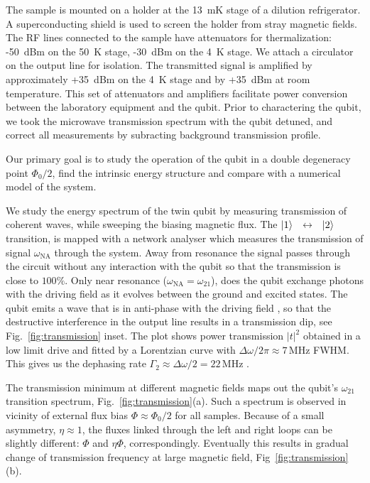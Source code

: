 \documentclass[%
reprint,
superscriptaddress,
bibnotes,
amsmath,
amssymb,
aps,
showkeys,
prb,
]{revtex4-1}
\newcommand{\iket}[1]{\ensuremath{\Ket{#1}}}
\newcommand{\ilra}{\ensuremath{\,\leftrightarrow\,}}
\begin{document}
The sample is mounted on a holder at the 13~mK
stage of  a dilution refrigerator.  A  superconducting shield is used  to screen
the holder  from stray magnetic  fields.  The RF  lines connected to  the sample
have attenuators for thermalization: -50~dBm on  the 50~K stage, -30~dBm on the
4~K  stage.  We  attach a  circulator on  the output  line for  isolation.  The
transmitted signal is amplified  by approximately +35~dBm on the 4~K stage  and by +35~dBm at
room  temperature.  This  set  of attenuators  and  amplifiers facilitate  power
conversion  between the  laboratory equipment  and the qubit.  Prior  to
charactering the qubit,  we  took  the microwave  transmission
spectrum with the qubit detuned, and  correct all measurements by subracting background
transmission profile.

Our primary goal  is to study the operation of the qubit in a double degeneracy point $\Phi_0/2$, find the intrinsic energy structure and  compare with a numerical model of the system.

We study the energy  spectrum  of the  twin qubit  by measuring transmission of coherent waves,  while  sweeping  the  biasing  magnetic flux.   
The  \iket{1}~\ilra~\iket{2}  transition, is  mapped  with a  network
analyser which measures  the transmission of signal  $\omega_{\text{NA}}$ through the
system.
Away from  resonance the signal passes through the  circuit without any
interaction with the qubit so that the transmission
is close to  $ 100\% $.  Only near resonance  ($\omega_{\text{NA}}=\omega_{21}$), does the
qubit exchange photons  with the driving field as it  evolves between the ground
and excited states.  The  qubit emits a wave that is in anti-phase with
the driving  field \cite{Abdumalikov_2010}, so that the  destructive interference in
the output line results in  a transmission dip, see Fig.~\ref{fig:transmission} inset. The plot shows power transmission $|t|^2$ obtained in a low limit drive and fitted by a Lorentzian curve with 
$\Delta\omega/2\pi\approx7\,\text{MHz}$ FWHM. This gives us the dephasing rate $\Gamma_2 \approx \Delta\omega/2 = 22\,\text{MHz}$ 
\cite{Astafiev_2010}.  

The transmission minimum at different magnetic fields
maps   out   the   qubit's   $\omega_{21}$  transition   spectrum, Fig.~\ref{fig:transmission}(a). 
Such a spectrum is observed in vicinity of external flux bias $\Phi \approx \Phi_0/2$ for all samples. 
Because  of  a  small
asymmetry, $\eta\approx1$, the fluxes linked through  the left and right loops can be slightly
different: $ \Phi$ and $ \eta\Phi $, correspondingly. Eventually this results in gradual change of transmission frequency at large magnetic field, Fig~\ref{fig:transmission}(b).
\end{document}

